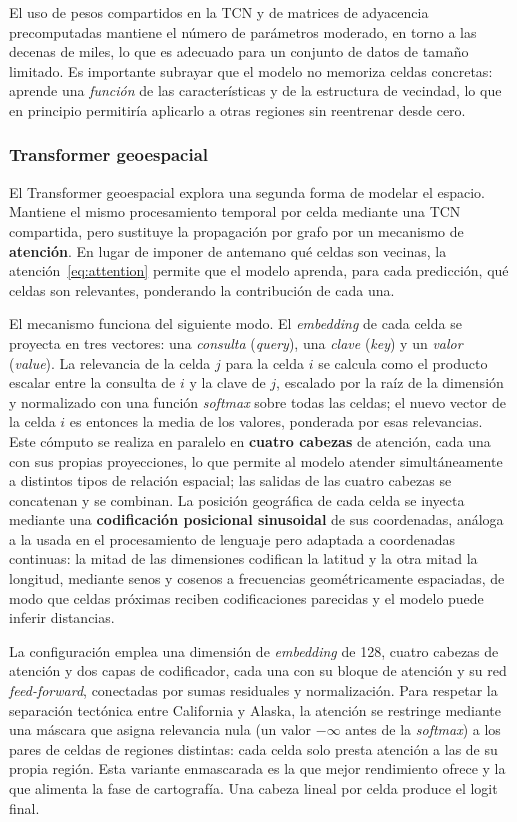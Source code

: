 El uso de pesos compartidos en la TCN y de matrices de adyacencia precomputadas mantiene el
número de parámetros moderado, en torno a las decenas de miles, lo que es adecuado para un
conjunto de datos de tamaño limitado. Es importante subrayar que el modelo no memoriza celdas
concretas: aprende una \emph{función} de las características y de la estructura de vecindad,
lo que en principio permitiría aplicarlo a otras regiones sin reentrenar desde cero.

\subsubsection{Transformer geoespacial}
\label{md-arq-transformer}

El Transformer geoespacial explora una segunda forma de modelar el espacio. Mantiene el mismo
procesamiento temporal por celda mediante una TCN compartida, pero sustituye la propagación
por grafo por un mecanismo de \textbf{atención}. En lugar de imponer de antemano qué celdas
son vecinas, la atención~\eqref{eq:attention} permite que el modelo aprenda, para cada
predicción, qué celdas son relevantes, ponderando la contribución de cada una.

El mecanismo funciona del siguiente modo. El \textit{embedding} de cada celda se proyecta en
tres vectores: una \emph{consulta} (\textit{query}), una \emph{clave} (\textit{key}) y un
\emph{valor} (\textit{value}). La relevancia de la celda \(j\) para la celda \(i\) se calcula
como el producto escalar entre la consulta de \(i\) y la clave de \(j\), escalado por la raíz
de la dimensión y normalizado con una función \textit{softmax} sobre todas las celdas; el
nuevo vector de la celda \(i\) es entonces la media de los valores, ponderada por esas
relevancias. Este cómputo se realiza en paralelo en \textbf{cuatro cabezas} de atención, cada
una con sus propias proyecciones, lo que permite al modelo atender simultáneamente a distintos
tipos de relación espacial; las salidas de las cuatro cabezas se concatenan y se combinan. La
posición geográfica de cada celda se inyecta mediante una \textbf{codificación posicional
  sinusoidal} de sus coordenadas, análoga a la usada en el procesamiento de lenguaje pero
adaptada a coordenadas continuas: la mitad de las dimensiones codifican la latitud y la otra
mitad la longitud, mediante senos y cosenos a frecuencias geométricamente espaciadas, de modo
que celdas próximas reciben codificaciones parecidas y el modelo puede inferir distancias.

La configuración emplea una dimensión de \textit{embedding} de 128, cuatro cabezas de
atención y dos capas de codificador, cada una con su bloque de atención y su red
\textit{feed-forward}, conectadas por sumas residuales y normalización. Para respetar la
separación tectónica entre California y Alaska, la atención se restringe mediante una máscara
que asigna relevancia nula (un valor \(-\infty\) antes de la \textit{softmax}) a los pares de
celdas de regiones distintas: cada celda solo presta atención a las de su propia región. Esta
variante enmascarada es la que mejor rendimiento ofrece y la que alimenta la fase de
cartografía. Una cabeza lineal por celda produce el logit final.

